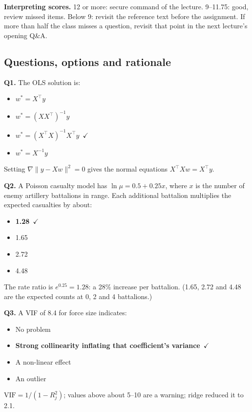 \documentclass[11pt]{article}
\begin{document}
\textbf{Interpreting scores.} 12 or more: secure command of the lecture. 9--11.75: good, review missed items. Below 9: revisit the reference text before the assignment. If more than half the class misses a question, revisit that point in the next lecture's opening Q\&A.

\subsection*{Questions, options and rationale}

{\small

\noindent\textbf{Q1.} The OLS solution is:\begin{itemize}[leftmargin=2.2em,itemsep=0pt,topsep=1pt]\item[A.] $w^*=X^\top y$\item[B.] $w^*=(XX^\top)^{-1}y$\item[\textbf{C.}] \textbf{$w^*=(X^\top X)^{-1}X^\top y$}~{\color{GrnN}$\checkmark$}\item[D.] $w^*=X^{-1}y$\end{itemize} Setting $\nabla\|y-Xw\|^2=0$ gives the normal equations $X^\top Xw=X^\top y$.\par\medskip

\noindent\textbf{Q2.} A Poisson casualty model has $\ln\mu=0.5+0.25x$, where $x$ is the number of enemy artillery battalions in range. Each additional battalion multiplies the expected casualties by about:\begin{itemize}[leftmargin=2.2em,itemsep=0pt,topsep=1pt]\item[\textbf{A.}] \textbf{1.28}~{\color{GrnN}$\checkmark$}\item[B.] 1.65\item[C.] 2.72\item[D.] 4.48\end{itemize} The rate ratio is $e^{0.25}=1.28$: a 28\% increase per battalion. (1.65, 2.72 and 4.48 are the expected counts at 0, 2 and 4 battalions.)\par\medskip

\noindent\textbf{Q3.} A VIF of 8.4 for force size indicates:\begin{itemize}[leftmargin=2.2em,itemsep=0pt,topsep=1pt]\item[A.] No problem\item[\textbf{B.}] \textbf{Strong collinearity inflating that coefficient's variance}~{\color{GrnN}$\checkmark$}\item[C.] A non-linear effect\item[D.] An outlier\end{itemize} $\text{VIF}=1/(1-R_j^2)$; values above about 5--10 are a warning; ridge reduced it to 2.1.\par\medskip

}
\end{document}
